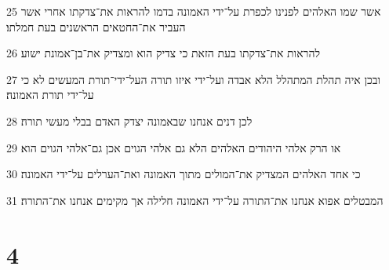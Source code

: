 \par 25 אשר שמו האלהים לפנינו לכפרת על־ידי האמונה בדמו להראות את־צדקתו אחרי אשר העביר את־החטאים הראשנים בעת חמלתו׃
\par 26 להראות את־צדקתו בעת הזאת כי צדיק הוא ומצדיק את־בן־אמונת ישוע׃
\par 27 ובכן איה תהלת המתהלל הלא אבדה ועל־ידי איזו תורה העל־ידי־תורת המעשים לא כי על־ידי תורת האמונה׃
\par 28 לכן דנים אנחנו שבאמונה יצדק האדם בבלי מעשי תורה׃
\par 29 או הרק אלהי היהודים האלהים הלא גם אלהי הגוים אכן גם־אלהי הגוים הוא׃
\par 30 כי אחד האלהים המצדיק את־המולים מתוך האמונה ואת־הערלים על־ידי האמונה׃
\par 31 המבטלים אפוא אנחנו את־התורה על־ידי האמונה חלילה אך מקימים אנחנו את־התורה׃

\chapter{4}

